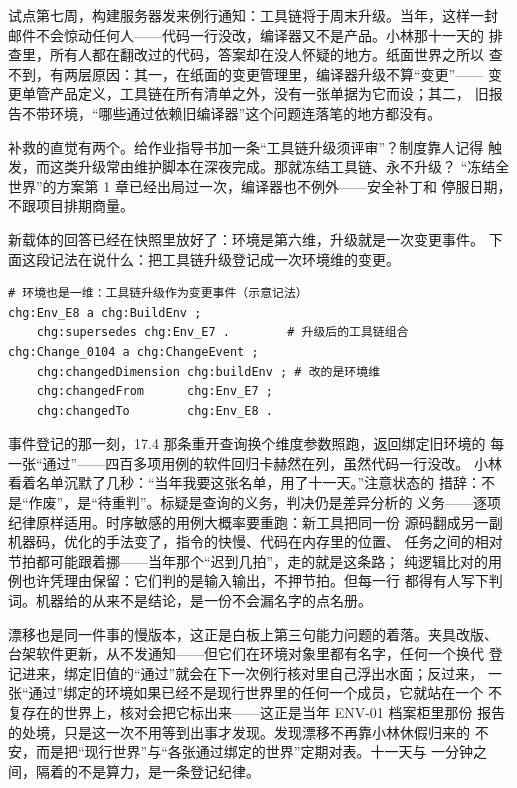 试点第七周，构建服务器发来例行通知：工具链将于周末升级。当年，这样一封
邮件不会惊动任何人——代码一行没改，编译器又不是产品。小林那十一天的
排查里，所有人都在翻改过的代码，答案却在没人怀疑的地方。纸面世界之所以
查不到，有两层原因：其一，在纸面的变更管理里，编译器升级不算“变更”——
变更单管产品定义，工具链在所有清单之外，没有一张单据为它而设；其二，
旧报告不带环境，“哪些通过依赖旧编译器”这个问题连落笔的地方都没有。

补救的直觉有两个。给作业指导书加一条“工具链升级须评审”？制度靠人记得
触发，而这类升级常由维护脚本在深夜完成。那就冻结工具链、永不升级？
“冻结全世界”的方案第 1 章已经出局过一次，编译器也不例外——安全补丁和
停服日期，不跟项目排期商量。

新载体的回答已经在快照里放好了：环境是第六维，升级就是一次变更事件。
下面这段记法在说什么：把工具链升级登记成一次环境维的变更。

\nopagebreak[4]
\begin{codebox}
\begin{Verbatim}[fontsize=\small,breaklines=true,breakanywhere=true,breaksymbolleft={},breaksymbolright={}]
# 环境也是一维：工具链升级作为变更事件（示意记法）
chg:Env_E8 a chg:BuildEnv ;
    chg:supersedes chg:Env_E7 .        # 升级后的工具链组合
chg:Change_0104 a chg:ChangeEvent ;
    chg:changedDimension chg:buildEnv ; # 改的是环境维
    chg:changedFrom      chg:Env_E7 ;
    chg:changedTo        chg:Env_E8 .
\end{Verbatim}
\end{codebox}

事件登记的那一刻，17.4 那条重开查询换个维度参数照跑，返回绑定旧环境的
每一张“通过”——四百多项用例的软件回归卡赫然在列，虽然代码一行没改。
小林看着名单沉默了几秒：“当年我要这张名单，用了十一天。”注意状态的
措辞：不是“作废”，是“待重判”。标疑是查询的义务，判决仍是差异分析的
义务——逐项纪律原样适用。时序敏感的用例大概率要重跑：新工具把同一份
源码翻成另一副机器码，优化的手法变了，指令的快慢、代码在内存里的位置、
任务之间的相对节拍都可能跟着挪——当年那个“迟到几拍”，走的就是这条路；
纯逻辑比对的用例也许凭理由保留：它们判的是输入输出，不押节拍。但每一行
都得有人写下判词。机器给的从来不是结论，是一份不会漏名字的点名册。

漂移也是同一件事的慢版本，这正是白板上第三句能力问题的着落。夹具改版、
台架软件更新，从不发通知——但它们在环境对象里都有名字，任何一个换代
登记进来，绑定旧值的“通过”就会在下一次例行核对里自己浮出水面；反过来，
一张“通过”绑定的环境如果已经不是现行世界里的任何一个成员，它就站在一个
不复存在的世界上，核对会把它标出来——这正是当年 ENV-01 档案柜里那份
报告的处境，只是这一次不用等到出事才发现。发现漂移不再靠小林休假归来的
不安，而是把“现行世界”与“各张通过绑定的世界”定期对表。十一天与
一分钟之间，隔着的不是算力，是一条登记纪律。

